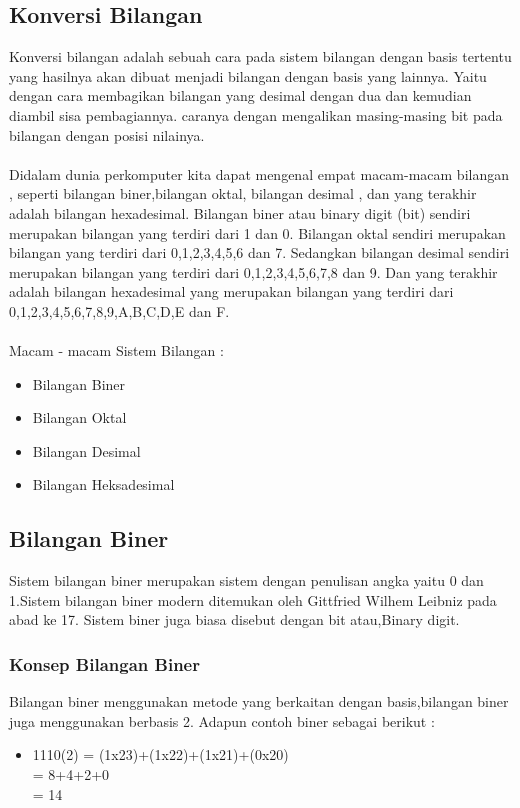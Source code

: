 ﻿\subsection{Konversi Bilangan}
Konversi bilangan adalah sebuah cara pada sistem bilangan dengan basis tertentu yang hasilnya akan dibuat menjadi bilangan dengan basis yang lainnya. 
Yaitu dengan cara membagikan bilangan yang desimal dengan dua dan kemudian diambil sisa pembagiannya.
caranya dengan mengalikan masing-masing bit pada bilangan dengan posisi nilainya.
\\\\Didalam dunia perkomputer kita dapat mengenal empat macam-macam bilangan , seperti bilangan biner,bilangan oktal, bilangan desimal , dan yang terakhir adalah bilangan hexadesimal. Bilangan biner atau binary digit (bit) sendiri merupakan bilangan yang terdiri dari 1 dan 0. Bilangan oktal sendiri merupakan bilangan yang terdiri dari 0,1,2,3,4,5,6 dan 7.
Sedangkan bilangan desimal sendiri merupakan bilangan yang terdiri dari 0,1,2,3,4,5,6,7,8 dan 9. Dan yang terakhir adalah bilangan hexadesimal yang merupakan bilangan yang terdiri dari 0,1,2,3,4,5,6,7,8,9,A,B,C,D,E dan F.
\\\\Macam - macam Sistem Bilangan :
\begin{itemize}
\item Bilangan Biner
\item Bilangan Oktal
\item Bilangan Desimal
\item Bilangan Heksadesimal
\end{itemize}

\subsection{Bilangan Biner}
Sistem bilangan biner merupakan sistem dengan penulisan angka yaitu 0 dan 1.Sistem bilangan biner modern ditemukan oleh Gittfried Wilhem Leibniz pada abad ke 17. Sistem biner juga biasa disebut dengan bit atau,Binary digit.
\subsubsection{Konsep Bilangan Biner}
Bilangan biner menggunakan metode yang berkaitan dengan basis,bilangan biner juga menggunakan berbasis 2. Adapun contoh biner sebagai berikut : \\
\begin{itemize}
\item 1110(2) = (1x23)+(1x22)+(1x21)+(0x20)\\
= 8+4+2+0\\
= 14 
\end{itemize}


